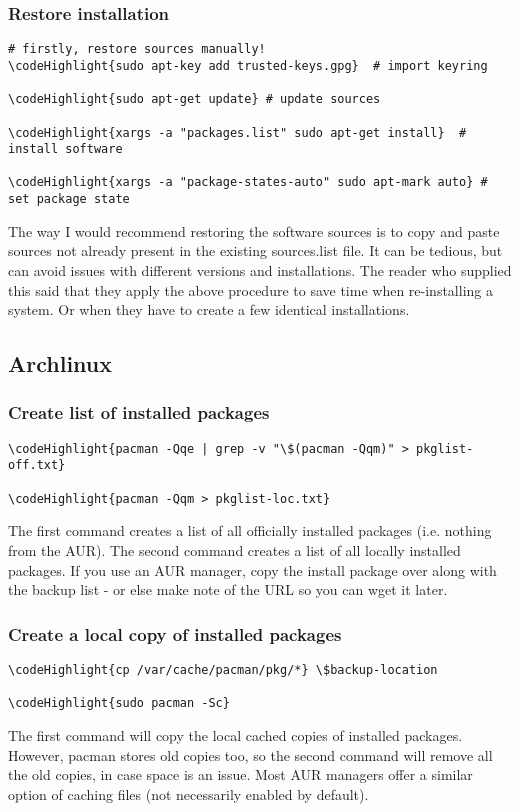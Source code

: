 \documentclass[12pt,a4paper]{article}
\begin{document}
\subsubsection{Restore installation}

\begin{Verbatim}[commandchars=\\\{\}]
# firstly, restore sources manually!
\codeHighlight{sudo apt-key add trusted-keys.gpg}  # import keyring

\codeHighlight{sudo apt-get update} # update sources

\codeHighlight{xargs -a "packages.list" sudo apt-get install}  # install software

\codeHighlight{xargs -a "package-states-auto" sudo apt-mark auto} # set package state
\end{Verbatim}
The way I would recommend restoring the software sources is to copy and paste sources not already present in the existing sources.list file.  It can be tedious, but can avoid issues with different versions and installations.  The reader who supplied this said that they apply the above procedure to save time when re-installing a system. Or when they have to create a few identical installations.

\subsection{Archlinux}

\subsubsection{Create list of installed packages}
\label{Arch-installed-packages}
\begin{Verbatim}[commandchars=\\\{\}]
\codeHighlight{pacman -Qqe | grep -v "\$(pacman -Qqm)" > pkglist-off.txt}

\codeHighlight{pacman -Qqm > pkglist-loc.txt}
\end{Verbatim}
The first command creates a list of all officially installed packages (i.e. nothing from the AUR). The second command creates a list of all locally installed packages. If you use an AUR manager, copy the install package over along with the backup list - or else make note of the URL so you can wget it later.

\subsubsection{Create a local copy of installed packages}
\begin{Verbatim}[commandchars=\\\{\}]
\codeHighlight{cp /var/cache/pacman/pkg/*} \$backup-location

\codeHighlight{sudo pacman -Sc}
\end{Verbatim}
The first command will copy the local cached copies of installed packages. However, pacman stores old copies too, so the second command will remove all the old copies, in case space is an issue. Most AUR managers offer a similar option of caching files (not necessarily enabled by default).
\end{document}

